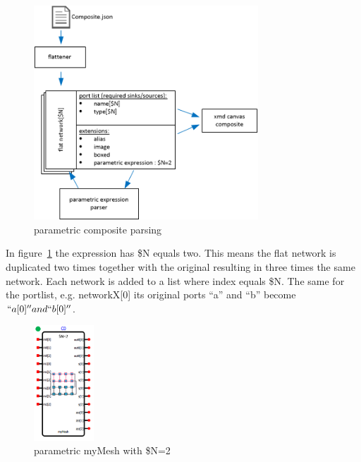 \begin{figure}[here]
\includegraphics[width=0.75\textwidth]{pictures/composite-parametric-parsing}
\caption{parametric composite parsing}
\label{fig:parametric-composite-parsing}
\end{figure}

In figure~\ref{fig:parametric-composite-parsing} the expression has \$N equals two.
This means the flat network is duplicated two times together with the
original resulting in three times the same network. Each network is added to a list
where index equals \$N. The same for the portlist, e.g. networkX[0] its original
ports ``a'' and ``b'' become $``a[0]'' and ``b[0]''$.

\begin{figure}
  \vspace{-20pt}
  \begin{center}
    \includegraphics[width=0.20\textwidth]{pictures/parametric-composite1}
  \caption{parametric myMesh with \$N=2}
  \label{fig:parametric-composite1}
  \end{center}
  \vspace{-20pt}
\end{figure}

